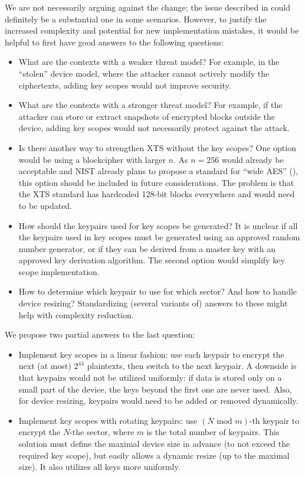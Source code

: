 \documentclass[a4paper]{article}
\begin{document}
We are not necessarily arguing against the change; the issue described in  could definitely be a substantial one in some scenarios. However, to justify the increased complexity and potential for new implementation mistakes, it would be helpful to first have good answers to the following questions:
\begin{itemize}
    \item What are the contexts with a weaker threat model? For example, in the ``stolen'' device model, where the attacker cannot actively modify the ciphertexts, adding key scopes would not improve security.
    \item What are the contexts with a stronger threat model? For example, if the attacker can store or extract snapshots of encrypted blocks outside the device, adding key scopes would not necessarily protect against the attack.
    \item Is there another way to strengthen XTS without the key scopes? One option would be using a blockcipher with larger $n$. As $n=256$ would already be acceptable and NIST already plans to propose a standard for ``wide AES'' (\cite{nistwideaes}), this option should be included in future considerations. The problem is that the XTS standard \cite{IEEE1619-2018} has hardcoded 128-bit blocks everywhere and would need to be updated.
    \item How should the keypairs used for key scopes be generated? It is unclear if all the keypairs used in key scopes must be generated using an approved random number generator, or if they can be derived from a master key with an approved key derivation algorithm. The second option would simplify key scope implementation.
    \item How to determine which keypair to use for which sector? And how to handle device resizing? Standardizing (several variants of) answers to these might help with complexity reduction.
\end{itemize}

We propose two partial answers to the last question:
\begin{itemize}
    \item Implement key scopes in a linear fashion: use each keypair to encrypt the next (at most) $2^{44}$ plaintexts, then switch to the next keypair. A downside is that keypairs would not be utilized uniformly: if data is stored only on a small part of the device, the keys beyond the first one are never used. Also, for device resizing, keypairs would need to be added or removed dynamically.

    \item Implement key scopes with rotating keypairs: use $(N \text{ mod } m)$-th keypair to encrypt the $N$-the sector, where $m$ is the total number of keypairs.
    This solution must define the maximal device size in advance (to not exceed the required key scope), but easily allows a dynamic resize (up to the maximal size). It also utilizes all keys more uniformly.
\end{itemize}
\end{document}
